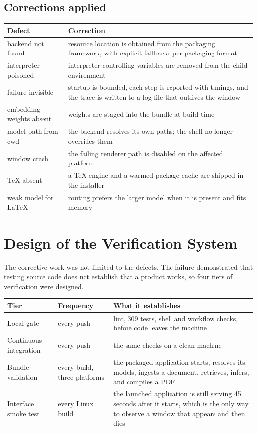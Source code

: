 \documentclass[11pt,a4paper]{article}
\begin{document}
\subsection{Corrections applied}

\begin{center}
\small
\begin{tabularx}{\linewidth}{@{}lX@{}}
\toprule
\textbf{Defect} & \textbf{Correction} \\
\midrule
backend not found & resource location is obtained from the packaging framework, with explicit fallbacks per packaging format \\
interpreter poisoned & interpreter-controlling variables are removed from the child environment \\
failure invisible & startup is bounded, each step is reported with timings, and the trace is written to a log file that outlives the window \\
embedding weights absent & weights are staged into the bundle at build time \\
model path from cwd & the backend resolves its own paths; the shell no longer overrides them \\
window crash & the failing renderer path is disabled on the affected platform \\
TeX absent & a TeX engine and a warmed package cache are shipped in the installer \\
weak model for LaTeX & routing prefers the larger model when it is present and fits memory \\
\bottomrule
\end{tabularx}
\end{center}

\section{Design of the Verification System}

The corrective work was not limited to the defects. The failure demonstrated
that testing source code does not establish that a product works, so four tiers
of verification were designed.

\begin{center}
\small
\begin{tabularx}{\linewidth}{@{}llX@{}}
\toprule
\textbf{Tier} & \textbf{Frequency} & \textbf{What it establishes} \\
\midrule
Local gate & every push & lint, 309 tests, shell and workflow checks, before code leaves the machine \\
Continuous integration & every push & the same checks on a clean machine \\
Bundle validation & every build, three platforms & the packaged application starts, resolves its models, ingests a document, retrieves, infers, and compiles a PDF \\
Interface smoke test & every Linux build & the launched application is still serving 45 seconds after it starts, which is the only way to observe a window that appears and then dies \\
\bottomrule
\end{tabularx}
\end{center}
\end{document}
